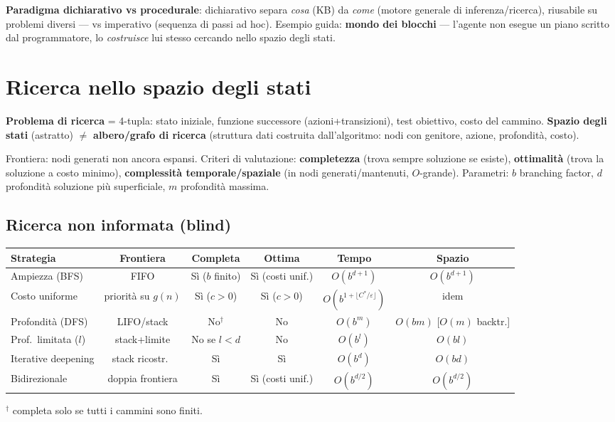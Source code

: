 \documentclass[10pt,a4paper]{article}
\begin{document}
\textbf{Paradigma dichiarativo vs procedurale}: dichiarativo separa \emph{cosa} (KB) da \emph{come} (motore generale di inferenza/ricerca), riusabile su problemi diversi --- vs imperativo (sequenza di passi ad hoc). Esempio guida: \textbf{mondo dei blocchi} --- l'agente non esegue un piano scritto dal programmatore, lo \emph{costruisce} lui stesso cercando nello spazio degli stati.

\section{Ricerca nello spazio degli stati}

\textbf{Problema di ricerca} = 4-tupla: stato iniziale, funzione successore (azioni+transizioni), test obiettivo, costo del cammino. \textbf{Spazio degli stati} (astratto) $\neq$ \textbf{albero/grafo di ricerca} (struttura dati costruita dall'algoritmo: nodi con genitore, azione, profondità, costo).

Frontiera: nodi generati non ancora espansi. Criteri di valutazione: \textbf{completezza} (trova sempre soluzione se esiste), \textbf{ottimalità} (trova la soluzione a costo minimo), \textbf{complessità temporale/spaziale} (in nodi generati/mantenuti, $O$-grande). Parametri: $b$ branching factor, $d$ profondità soluzione più superficiale, $m$ profondità massima.

\subsection{Ricerca non informata (blind)}

\begin{center}
\begin{tabular}{@{}lccccc@{}}
\toprule
\textbf{Strategia} & \textbf{Frontiera} & \textbf{Completa} & \textbf{Ottima} & \textbf{Tempo} & \textbf{Spazio} \\
\midrule
Ampiezza (BFS) & FIFO & Sì ($b$ finito) & Sì (costi unif.) & $O(b^{d+1})$ & $O(b^{d+1})$ \\
Costo uniforme & priorità su $g(n)$ & Sì ($c>0$) & Sì ($c>0$) & $O(b^{1+\lfloor C^*/\varepsilon \rfloor})$ & idem \\
Profondità (DFS) & LIFO/stack & No$^\dagger$ & No & $O(b^m)$ & $O(bm)$ [$O(m)$ backtr.] \\
Prof.\ limitata ($l$) & stack+limite & No se $l<d$ & No & $O(b^l)$ & $O(bl)$ \\
Iterative deepening & stack ricostr.\ & Sì & Sì & $O(b^d)$ & $O(bd)$ \\
Bidirezionale & doppia frontiera & Sì & Sì (costi unif.) & $O(b^{d/2})$ & $O(b^{d/2})$ \\
\bottomrule
\end{tabular}
\end{center}
\footnotesize{$^\dagger$ completa solo se tutti i cammini sono finiti.}\normalsize
\end{document}

